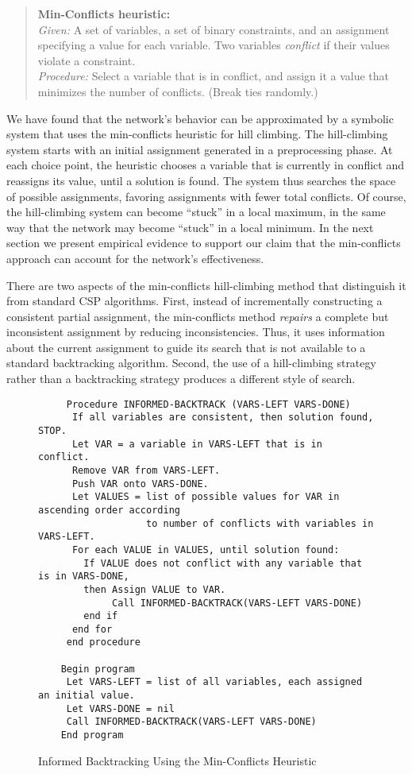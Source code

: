 {\small
\begin{quote}
{\bf Min-Conflicts heuristic:}\\
{\em Given:} A set of variables, a set of binary constraints, 
and an assignment specifying a value for each variable. 
Two variables {\em conflict} if their values violate a constraint.\\
{\em Procedure:} Select a variable that is in conflict,
and assign it a value that minimizes the number of conflicts.
(Break ties randomly.)
\end{quote}
}

We have found that the network's behavior can be approximated by a
symbolic system that uses the min-conflicts heuristic for
hill climbing.  The hill-climbing system starts with an initial
assignment generated in a preprocessing phase.  At each choice point,
the heuristic chooses a variable that is currently in conflict and
reassigns its value, until a solution is found. The system thus
searches the space of possible assignments, favoring assignments with
fewer total conflicts.  Of course, the hill-climbing system can become
``stuck'' in a local maximum, in the same way that the network may
become ``stuck'' in a local minimum.  In the next section we present
empirical evidence to support our claim that the min-conflicts
approach can account for the network's effectiveness.

   There are two aspects of the min-conflicts hill-climbing method
that distinguish it from standard CSP algorithms.
First, instead of incrementally constructing a consistent partial
assignment, the min-conflicts method {\em repairs} a complete but
inconsistent assignment by reducing inconsistencies.  Thus, it uses
information about the current assignment to guide its search that is
not available to a standard backtracking algorithm. Second,
the use of a hill-climbing strategy rather than a backtracking strategy
produces a different style of search.

\begin{figure}
{\small
{\bf
\begin{verbatim}
     Procedure INFORMED-BACKTRACK (VARS-LEFT VARS-DONE)
      If all variables are consistent, then solution found, STOP.
      Let VAR = a variable in VARS-LEFT that is in conflict.
      Remove VAR from VARS-LEFT.
      Push VAR onto VARS-DONE.
      Let VALUES = list of possible values for VAR in ascending order according 
                   to number of conflicts with variables in VARS-LEFT.
      For each VALUE in VALUES, until solution found:
        If VALUE does not conflict with any variable that is in VARS-DONE, 
        then Assign VALUE to VAR.
             Call INFORMED-BACKTRACK(VARS-LEFT VARS-DONE)
        end if
      end for
     end procedure
    
    Begin program
     Let VARS-LEFT = list of all variables, each assigned an initial value.
     Let VARS-DONE = nil
     Call INFORMED-BACKTRACK(VARS-LEFT VARS-DONE)
    End program
    \end{verbatim}
}
}
\caption{Informed Backtracking Using the Min-Conflicts Heuristic}
\label{iback}
\end{figure}



